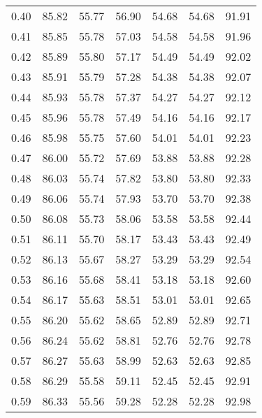 \begin{tabular}{|c|c|c|c|c|c|c|}
      0.40 &     85.82 &     55.77 &      56.90 &   54.68 &      54.68 &         91.91 \\
      0.41 &     85.85 &     55.78 &      57.03 &   54.58 &      54.58 &         91.96 \\
      0.42 &     85.89 &     55.80 &      57.17 &   54.49 &      54.49 &         92.02 \\
      0.43 &     85.91 &     55.79 &      57.28 &   54.38 &      54.38 &         92.07 \\
      0.44 &     85.93 &     55.78 &      57.37 &   54.27 &      54.27 &         92.12 \\
      0.45 &     85.96 &     55.78 &      57.49 &   54.16 &      54.16 &         92.17 \\
      0.46 &     85.98 &     55.75 &      57.60 &   54.01 &      54.01 &         92.23 \\
      0.47 &     86.00 &     55.72 &      57.69 &   53.88 &      53.88 &         92.28 \\
      0.48 &     86.03 &     55.74 &      57.82 &   53.80 &      53.80 &         92.33 \\
      0.49 &     86.06 &     55.74 &      57.93 &   53.70 &      53.70 &         92.38 \\
      0.50 &     86.08 &     55.73 &      58.06 &   53.58 &      53.58 &         92.44 \\
      0.51 &     86.11 &     55.70 &      58.17 &   53.43 &      53.43 &         92.49 \\
      0.52 &     86.13 &     55.67 &      58.27 &   53.29 &      53.29 &         92.54 \\
      0.53 &     86.16 &     55.68 &      58.41 &   53.18 &      53.18 &         92.60 \\
      0.54 &     86.17 &     55.63 &      58.51 &   53.01 &      53.01 &         92.65 \\
      0.55 &     86.20 &     55.62 &      58.65 &   52.89 &      52.89 &         92.71 \\
      0.56 &     86.24 &     55.62 &      58.81 &   52.76 &      52.76 &         92.78 \\
      0.57 &     86.27 &     55.63 &      58.99 &   52.63 &      52.63 &         92.85 \\
      0.58 &     86.29 &     55.58 &      59.11 &   52.45 &      52.45 &         92.91 \\
      0.59 &     86.33 &     55.56 &      59.28 &   52.28 &      52.28 &         92.98 \\

\end{tabular}
